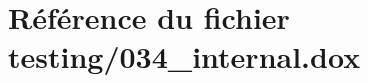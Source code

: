 \hypertarget{034__internal_8dox}{}\section{Référence du fichier testing/034\+\_\+internal.dox}
\label{034__internal_8dox}
